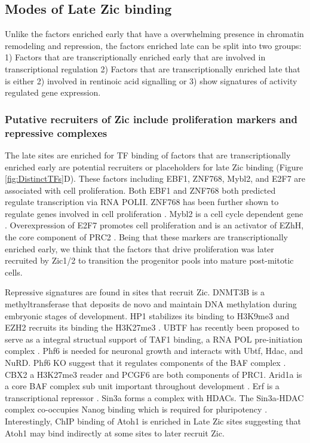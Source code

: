 \documentclass[fleqn,10pt,twocolumn]{wlscirep}
\begin{document}

\subsection*{Modes of Late Zic binding}
Unlike the factors enriched early that have a overwhelming presence in chromatin remodeling and repression, the factors enriched late can be split into two groups: 1) Factors that are transcriptionally enriched early that are involved in transcriptional regulation 2) Factors that are transcriptionally enriched late that is either 2) involved in rentinoic acid signalling or 3)  show signatures of activity regulated gene expression. 

\subsubsection*{Putative recruiters of Zic include proliferation markers and repressive complexes}
The late sites are enriched for TF binding of factors that are transcriptionally enriched early are potential recruiters or placeholders for late Zic binding (Figure \ref{fig:DistinctTFs}D). These factors including EBF1, ZNF768, Mybl2, and E2F7 are associated with cell proliferation. Both EBF1 and ZNF768 both predicted regulate transcription via RNA POLII. ZNF768 has been further shown to regulate genes involved in cell proliferation \cite{Villot2021Znf768Fingers}. Mybl2 is a cell cycle dependent gene \cite{Liu1996CellElement}. Overexpression of E2F7 promotes cell proliferation and is an activator of EZhH, the core component of PRC2 \cite{Yang2020E2F7EZH2Progression}.  Being that these markers are transcriptionally enriched early, we think that the factors that drive proliferation was later recruited by Zic1/2 to transition the progenitor pools into mature post-mitotic cells.

Repressive signatures are found in sites that recruit Zic. DNMT3B is a methyltransferase that deposits de novo and maintain DNA methylation  during embryonic stages of development. HP1 stabilizes its binding to H3K9me3 and EZH2 recruits its binding the H3K27me3 \cite{Gagliardi2018Dnmt3bDisease}. UBTF has recently been proposed to serve as a integral structual support of TAF1 binding, a RNA POL pre-initiation complex \cite{Tremblay2022RibosomalSyndrome}. Phf6 is needed for neuronal growth and interacts with Ubtf, Hdac, and NuRD. Phf6 KO suggest that it regulates components of the BAF complex \cite{Fliedner2020LossCells}. CBX2 a H3K27me3 reader and PCGF6 are both components of PRC1\cite{Aranda2015RegulationProteins}. Arid1a is a core BAF complex sub unit important throughout development  \cite{Alfert2019TheDisease}. Erf is a transcriptional repressor \cite{Sgouras1995ERFStimulation}. Sin3a forms a  complex with HDACs. The Sin3a-HDAC complex co-occupies Nanog binding which is required for pluripotency \cite{Saunders2017ThePluripotency}. Interestingly, ChIP binding of Atoh1 is enriched in Late Zic sites suggesting that Atoh1 may bind indirectly at some sites to later recruit Zic. 
\end{document}
